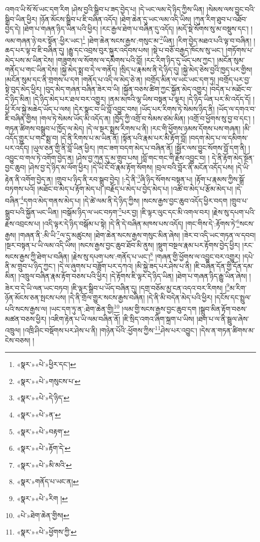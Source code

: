 འགའ་ཡི་སོ་སོ་ཡང་དག་རིག །ཤེས་བྱའི་སྒྲིབ་པ་ཟད་བྱེད་པ། །དེ་ཡང་ལམ་དེ་ཉིད་ཀྱིས་ཡིན། །སེམས་ལས་བྱུང་བའི་སྒྲིབ་ཡིན་ཕྱིར། །ཉོན་མོངས་སྒྲིབ་པ་ཇི་བཞིན་འདོད། །ཐེག་ཆེན་དུ་ཡང་ལམ་འདི་ཡིས། །ཀུན་རིག་ཐུབ་པ་འཐོབ་བྱེད་དེ། །ཐེག་པ་གཞན་ཉིད་ཡིན་པའི་ཕྱིར། །རང་རྒྱལ་ཐེག་པ་བཞིན་དུ་འདོད། །མདོ་སྡེ་སོགས་སུ་མ་བསྡུས་དང་། །ལམ་གཞན་ཉེ་བར་སྟོན་:ཕྱིར་ཡང་།\footnote{«སྣར་»«པེ་»ཕྱིར་དང་།} །ཐེག་ཆེན་སངས་རྒྱས་:གསུང་མ་\footnote{«སྣར་»«པེ་»གསུངས་པ་}ཡིན། །རིག་བྱེད་མཐའ་པའི་ལྟ་བ་བཞིན། །ཆད་པར་ལྟ་བ་ཇི་བཞིན་དུ། །རྒྱུ་དང་འབྲས་བུར་སྐུར་འདེབས་པས། །སྡེ་པ་བཅོ་བརྒྱད་ཁོངས་སུ་ཡང་། །གཏོགས་པ་མེད་པས་མ་ཡིན་ངེས། །གཟུགས་ལ་སོགས་ལ་དམིགས་པའི་བློ། །རང་རིག་ཉིད་དུ་ཡོད་པས་ཀྱང་། །མངོན་སུམ་གནོད་པ་གང་ཡིན་དེས། །སྐྱེ་མེད་སྨྲ་བ་དེ་ལ་གནོད། །སྲིད་པ་རྣམས་ནི་དེ་ཉིད་དུ། །སྐྱེ་མེད་ཅེས་བྱའི་ཁྱད་པར་གྱིས། །མངོན་སུམ་དང་ནི་གྲགས་པ་དག །གནོད་པ་འདི་ལ་མེད་ཅེ་ན། །བགྲོད་མིན་ལ་ཡང་ཡང་དག་ཏུ། །བགྲོད་པར་བྱ་སྟེ་བུད་མེད་ཕྱིར། །བུད་མེད་གཞན་བཞིན་ཟེར་བ་ཡི། །སྐྱོན་བཅས་ཚིག་ཀྱང་སྐྱོན་མེད་འགྱུར། །བདེན་པ་མཐོང་བ་དེ་ཉིད་མིན། །དེ་ཉིད་མེད་པར་ཐལ་བར་འགྱུར། །ནམ་མཁའི་ལྷ་ཡིས་བསྟན་པ་ལྟར། །དེ་ཉིད་ཡིན་པར་མི་འདོད་དོ། །ཕྱི་རོལ་སྐྱེ་མཆེད་ཡོད་པ་ལས། །དེར་སྣང་བ་ཡི་བློ་འབྱུང་བས། །ཡོད་པར་རིགས་ཏེ་སེམས་ཉིད་ནི། །ཡོད་ལ་དགའ་བ་ཇི་བཞིན་གྱིས། །གལ་ཏེ་སེམས་ཡོད་མི་འདོད་ན། །ཁྱོད་ཀྱི་འགྲོ་བ་སེམས་ཙམ་མིན། །འགྲོ་བ་ཕྱོགས་སུ་བྱ་བ་དང་། །གཏན་ཚིགས་བསྒྲུབ་པ་ཁྱོད་ལ་མེད། །དེ་ལ་སྔར་སྨྲས་རིགས་པ་ནི། །རང་གི་ཕྱོགས་ཉམས་དོགས་པས་གཞན། །མི་འདོད་གྱུར་པ་གང་སྨྲ་བ། །དེ་ནི་རིགས་པ་མ་ཡིན་ནོ། །སྟོན་པའི་རྣམ་པར་མི་རྟོག་བློ། །བདག་མེད་པ་ལ་དམིགས་པར་འདོད། །ཡུལ་ཅན་གྱི་ནི་བློ་ཡིན་ཕྱིར། །གང་ཟག་བདག་མེད་པ་བཞིན་ནོ། །སྦྱོར་ལས་བྱུང་སོགས་བློ་དག་ནི། །འབྱུང་བ་གལ་ཏེ་འགོག་བྱེད་ན། །ཤེས་བྱ་ཀུན་དུ་མ་གྲུབ་པས། །བློ་གང་གང་གི་རྗེས་འབྱུང་བ། །
དེ་ནི་རྟོག་མེད་སྔོན་བྱང་ཆུབ། །ཤེས་བྱ་དེ་ཉིད་མ་ལོག་ཕྱིར། །དེ་ཡི་ངོ་བོ་རྣམ་རྟོག་སོགས། །བྲལ་བའི་བློར་ནི་མངོན་འདོད་པས། །དེ་ཡི་རྟེན་ནི་འགོག་བྱེད་ན། །གྲུབ་པ་ཉིད་ནི་རབ་སྒྲུབ་བྱེད། །:དེ་ནི་\footnote{«སྣར་»«པེ་»དེ་ཉིད་}ཞི་ཉིད་སོགས་བསྟན་པ། །རྟོག་པ་རྣམས་ཀྱིས་སྒྲོ་བཏགས་པའོ། །མཐོང་བ་མེད་པ་རྟོག་མེད་པ། །བརྗོད་པ་མེད་པ་བྱེད་མེད་པ། །འཚོ་བ་མེད་པ་རྩོམ་མེད་པ། །དེ་བཞིན་\footnote{«སྣར་»«པེ་»ན་}དགའ་མེད་གནས་མེད་པ། །དེ་ཚེ་ལམ་ནི་དེ་ཉིད་ཀྱིས། །སངས་རྒྱས་བྱང་ཆུབ་འདོད་ཕྱིར་བདག །གྲུབ་པ་སྒྲུབ་པའི་སྐྱོན་ཡང་ཡིན། །བསྒོམ་ཉིད་ལ་ཡང་བཏག་\footnote{«སྣར་»«པེ་»བརྟག་}པར་བྱ། །ཇི་ལྟར་ལུང་དང་མི་འགལ་བར། །རྗེས་སུ་དཔག་པའི་རྗེས་འབྲངས་པ། །འདི་ལྟར་དེ་ཉིད་བསྒོམ་པ་སྟེ། །དེ་ནི་དེ་བཞིན་མཁས་པས་འདོད། །གང་གིས་དེ་:རྟོགས་ཏེ་\footnote{«སྣར་»«པེ་»རྟོག་དེ་}སངས་རྒྱས། །གཞན་ནི་:མི་ཡི་\footnote{«སྣར་»«པེ་»མི་མའི་}ལ་དུ་མཚུངས། །ཐེག་ཆེན་སངས་རྒྱས་གསུང་མིན་ཞེས། །ཟེར་བ་འདི་ཡང་གཏན་ལ་དབབ། །སྔར་བསྟན་པ་ཡི་ལམ་འདི་ཡིས། །སངས་རྒྱས་བྱང་ཆུབ་ཐོབ་མི་ནུས། །སྡུག་བསྔལ་རྣམ་པར་རྟོགས་བྱེད་ཕྱིར། །རང་སངས་རྒྱས་ཀྱི་ཐེག་པ་བཞིན། །རྗེས་སུ་དཔག་པས་:གནོད་པ་ཡང་།\footnote{«སྣར་»གནོད་པ་ཡང་ན།} །གཞན་གྱི་ཕྱོགས་ལ་འབྱུང་བར་འགྱུར། །དཔེ་ནི་མ་གྲུབ་པ་ཉིད་ཀྱང་། །དེ་ལ་ཞུགས་པ་བཟློག་པར་དཀའ། །མི་སྐྱེ་ཟད་པར་ཤེས་པ་ནི། །ཇི་བཞིན་དོན་གྱི་དོན་དམ་མིན། །འཁྲུལ་བཞིན་རྣམ་རྟོག་བཅས་པའི་ཕྱིར། །དེ་རྟོགས་ཇི་ལྟར་དེ་ཉིད་ཡིན། །ཐེག་པ་གཞན་ཉིད་རྒྱུ་ཡིན་ཞེས། །ཟེར་བ་དེ་ཡི་ལན་ཡང་བཏབ། །ཇི་ལྟར་སྒྲིབ་པ་ཡོད་བཞིན་དུ། །དགྲ་བཅོམ་མྱ་ངན་འདའ་བར་རིགས། །\footnote{«སྣར་»«པེ་»རིག །}མ་རིག་ཉོན་མོངས་ཅན་སྤངས་པས། །དེ་ནི་གྲོལ་གྱུར་སངས་རྒྱས་བཞིན། །དེ་ནི་མི་བདེན་མེད་པའི་ཕྱིར། །དངོས་དང་སྤྲུལ་པའི་སངས་རྒྱས་ལ། །ཡང་དག་ཏུ་ན་:ཐེག་ཆེན་གྱི།\footnote{«པེ་»ཐེག་ཆེན་གྱིས།} །ལམ་གྱི་སངས་རྒྱས་བྱང་ཆུབ་དག །སྒྲུབ་མིན་རྟོག་བཅས་མཚན་བཅས་ཕྱིར། །འཇིག་རྟེན་པ་ཡི་ལམ་བཞིན་ནོ། །ཇི་སྲིད་འགའ་ཞིག་སྐྲག་པ་ཡིས། །ཐག་པ་ལ་ནི་སྦྲུལ་ཞེས་འཁྲུལ། །འཁྲི་ཤིང་བསྡོགས་པར་ཤེས་པ་ནི། །གཉེན་པོའི་:ཕྱོགས་ཀྱིས་\footnote{«སྣར་»«པེ་»ཕྱོགས་ཀྱི་}ཤེས་པར་འབྱུང་། །དེས་ན་གཏན་ཚིགས་མ་ངེས་བཅས། །
